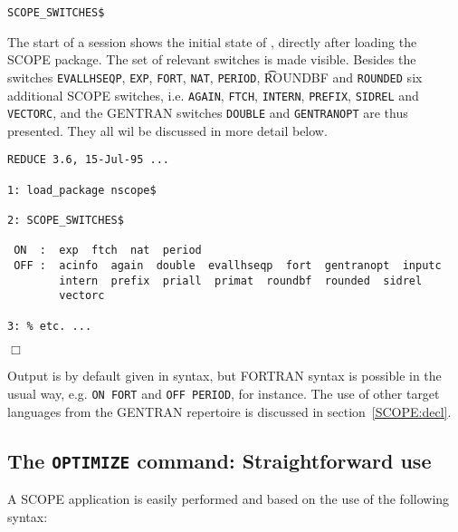 \hspace*{1cm} {\tt SCOPE\_SWITCHES}\verb+$+


\example\label{ex:3.1.1}

The start of a {\REDUCE} session shows the initial state
of {\REDUCE}, directly after loading the SCOPE package.
The set of relevant switches is made visible.
Besides the {\REDUCE} switches {\tt EVALLHSEQP}, {\tt EXP}, {\tt FORT},
{\tt NAT}, {\tt PERIOD}, {\t ROUNDBF}
and {\tt ROUNDED} six additional SCOPE switches, i.e. {\tt AGAIN}, {\tt FTCH},
{\tt INTERN}, {\tt PREFIX}, {\tt SIDREL} and {\tt VECTORC}, and the GENTRAN
switches {\tt DOUBLE} and {\tt GENTRANOPT} are thus presented.
They all wil be discussed in more
detail below.

{\small
\begin{verbatim}
REDUCE 3.6, 15-Jul-95 ...

1: load_package nscope$

2: SCOPE_SWITCHES$

 ON  :  exp  ftch  nat  period
 OFF :  acinfo  again  double  evallhseqp  fort  gentranopt  inputc
        intern  prefix  priall  primat  roundbf  rounded  sidrel
        vectorc

3: % etc. ...
\end{verbatim}
\begin{flushright}
$\Box$
\end{flushright}}

Output is by default given in {\REDUCE} syntax, but FORTRAN syntax is
possible in the usual way, e.g. {\tt ON FORT} and {\tt OFF PERIOD}, for
instance.  The use of other target languages
from the GENTRAN repertoire is discussed in section~\ref{SCOPE:decl}.

\subsection{The {\tt OPTIMIZE} command: Straightforward use}\label{SCOPE:optim}

A SCOPE application is easily performed and based on the use of
the following syntax:

